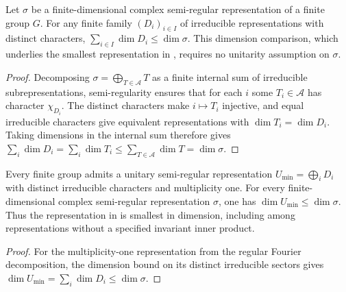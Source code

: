 \begin{lemma}
    \label{thm:peps_semiregular_dimension_bound}
    \leanok
    Let $\sigma$ be a finite-dimensional complex semi-regular representation
    of a finite group $G$. For any finite family $(D_i)_{i\in I}$ of
    irreducible representations with distinct characters,
    $\sum_{i\in I}\dim D_i\leq\dim\sigma$.
    This dimension comparison, which underlies the smallest representation
    in \cite[Section~7]{Schuch2010PEPS}, requires no unitarity assumption on
    $\sigma$.
\end{lemma}
\begin{proof}\leanok
    Decomposing $\sigma=\bigoplus_{T\in\mathcal A}T$ as a finite internal sum
    of irreducible subrepresentations, semi-regularity ensures that for each
    $i$ some $T_i\in\mathcal A$ has character $\chi_{D_i}$.
    The distinct characters make $i\mapsto T_i$ injective, and equal
    irreducible characters give equivalent representations with
    $\dim T_i=\dim D_i$.
    Taking dimensions in the internal sum therefore gives
    $\sum_i\dim D_i=\sum_i\dim T_i\leq
        \sum_{T\in\mathcal A}\dim T=\dim\sigma$.
\end{proof}

\begin{lemma}
    \label{thm:peps_smallest_semiregular_representation}
    \leanok
    Every finite group admits a unitary semi-regular representation
    $U_{\min}=\bigoplus_iD_i$ with distinct irreducible characters and
    multiplicity one. For every finite-dimensional complex semi-regular
    representation $\sigma$, one has $\dim U_{\min}\leq\dim\sigma$.
    Thus the representation in \cite[Section~7]{Schuch2010PEPS} is
    smallest in dimension, including among representations without
    a specified invariant inner product.
\end{lemma}
\begin{proof}\leanok
    For the multiplicity-one representation from the regular Fourier
    decomposition, the dimension bound on its distinct irreducible
    sectors gives $\dim U_{\min}=\sum_i\dim D_i\leq\dim\sigma$.
\end{proof}
